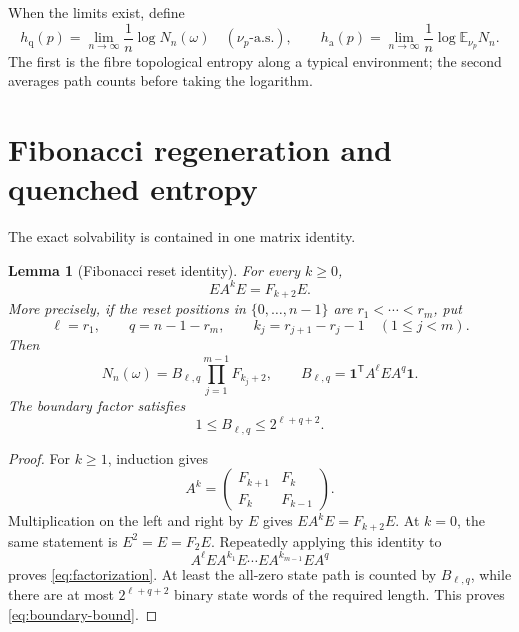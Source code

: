 \documentclass[11pt,a4paper]{amsart}
\newtheorem{lemma}[theorem]{Lemma}
\theoremstyle{definition}
\theoremstyle{remark}
\newcommand{\Exp}{\mathbb E}
\newcommand{\one}{\mathbf 1}
\newcommand{\hq}{h_{\mathrm q}}
\newcommand{\ha}{h_{\mathrm a}}
\begin{document}
When the limits exist, define
\begin{equation}\label{eq:two-entropies}
 \hq(p)=\lim_{n\to\infty}\frac1n\log N_n(\omega)
 \quad(\nu_p\text{-a.s.}),
 \qquad
 \ha(p)=\lim_{n\to\infty}\frac1n\log\Exp_{\nu_p}N_n.
\end{equation}
The first is the fibre topological entropy along a typical environment; the
second averages path counts before taking the logarithm.

\section{Fibonacci regeneration and quenched entropy}
\label{sec:quenched}

The exact solvability is contained in one matrix identity.

\begin{lemma}[Fibonacci reset identity]\label{lem:fibonacci-reset}
For every $k\geq0$,
\begin{equation}\label{eq:reset-identity}
 EA^kE=F_{k+2}E.
\end{equation}
More precisely, if the reset positions in $\{0,\ldots,n-1\}$ are
$r_1<\cdots<r_m$, put
\[
 \ell=r_1,\qquad q=n-1-r_m,
 \qquad k_j=r_{j+1}-r_j-1\quad(1\leq j<m).
\]
Then
\begin{equation}\label{eq:factorization}
 N_n(\omega)=B_{\ell,q}\prod_{j=1}^{m-1}F_{k_j+2},
 \qquad
 B_{\ell,q}=\one^{\mathsf T}A^\ell EA^q\one.
\end{equation}
The boundary factor satisfies
\begin{equation}\label{eq:boundary-bound}
 1\leq B_{\ell,q}\leq2^{\ell+q+2}.
\end{equation}
\end{lemma}

\begin{proof}
For $k\geq1$, induction gives
\[
 A^k=\begin{pmatrix}F_{k+1}&F_k\\F_k&F_{k-1}\end{pmatrix}.
\]
Multiplication on the left and right by $E$ gives
$EA^kE=F_{k+2}E$.  At $k=0$, the same statement is
$E^2=E=F_2E$.  Repeatedly applying this identity to
\[
 A^\ell EA^{k_1}E\cdots EA^{k_{m-1}}EA^q
\]
proves \eqref{eq:factorization}.  At least the all-zero state path is
counted by $B_{\ell,q}$, while there are at most
$2^{\ell+q+2}$ binary state words of the required length.  This proves
\eqref{eq:boundary-bound}.
\end{proof}
\end{document}
